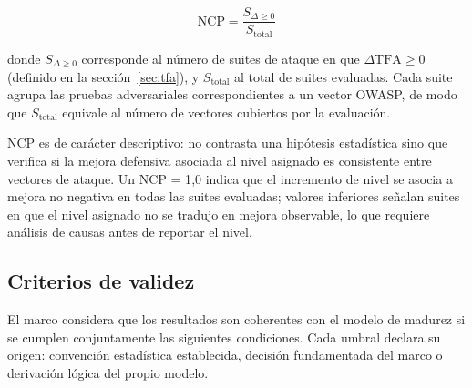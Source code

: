 \[
  \text{NCP} = \frac{S_{\Delta \geq 0}}{S_{\text{total}}}
\]

donde $S_{\Delta \geq 0}$ corresponde al número de suites de ataque en que
$\Delta\text{TFA} \geq 0$ (definido en la sección~\ref{sec:tfa}), y
$S_{\text{total}}$ al total de suites evaluadas. Cada suite agrupa las
pruebas adversariales correspondientes a un vector OWASP, de modo que
$S_{\text{total}}$ equivale al número de vectores cubiertos por la
evaluación.

NCP es de carácter descriptivo: no contrasta una hipótesis estadística
sino que verifica si la mejora defensiva asociada al nivel asignado es
consistente entre vectores de ataque. Un NCP = 1{,}0 indica que el
incremento de nivel se asocia a mejora no negativa en todas las suites
evaluadas; valores inferiores señalan suites en que el nivel asignado
no se tradujo en mejora observable, lo que requiere análisis de causas
antes de reportar el nivel.

\subsection{Criterios de validez}
\label{sec:criterios-validez}

El marco considera que los resultados son coherentes con el modelo de madurez si se cumplen conjuntamente las siguientes condiciones. Cada umbral declara su origen: convención estadística establecida, decisión fundamentada del marco o derivación lógica del propio modelo.

